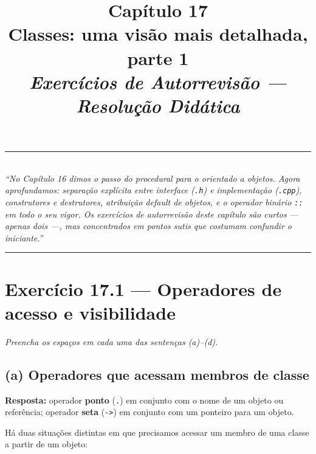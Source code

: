 \documentclass[11pt,a4paper]{article}
\title{
  \vspace{-1cm}
  {\Huge\bfseries\color{deitelblue} Cap\'itulo 17}\\[0.3em]
  {\Large\bfseries Classes: uma vis\~ao mais detalhada, parte 1}\\[0.8em]
  {\large\itshape Exerc\'icios de Autorrevis\~ao --- Resolu\c{c}\~ao Did\'atica}
}
\author{}
\date{}
\begin{document}
\maketitle
\thispagestyle{empty}
\vspace{-2em}

\begin{center}
\rule{0.85\textwidth}{0.5pt}\\[0.4em]
\textit{``No Cap\'itulo 16 dimos o passo do procedural para o orientado a objetos. Agora aprofundamos: separa\c{c}\~ao expl\'icita entre interface (\texttt{.h}) e implementa\c{c}\~ao (\texttt{.cpp}), construtores e destrutores, atribui\c{c}\~ao default de objetos, e o operador bin\'ario \texttt{::} em todo o seu vigor. Os exerc\'icios de autorrevisão deste cap\'itulo s\~ao curtos --- apenas dois ---, mas concentrados em pontos sutis que costumam confundir o iniciante.''}\\[0.4em]
\rule{0.85\textwidth}{0.5pt}
\end{center}

\vspace{1em}

\section{Exerc\'icio 17.1 --- Operadores de acesso e visibilidade}

\textit{Preencha os espa\c{c}os em cada uma das senten\c{c}as (a)--(d).}

\subsection*{(a) Operadores que acessam membros de classe}

\begin{resposta}\textbf{Resposta:} operador \textbf{ponto} (\texttt{.}) em conjunto com o nome de um objeto ou refer\^encia; operador \textbf{seta} (\texttt{->}) em conjunto com um ponteiro para um objeto.\end{resposta}

H\'a duas situa\c{c}\~oes distintas em que precisamos acessar um membro de uma classe a partir de um objeto:
\end{document}
